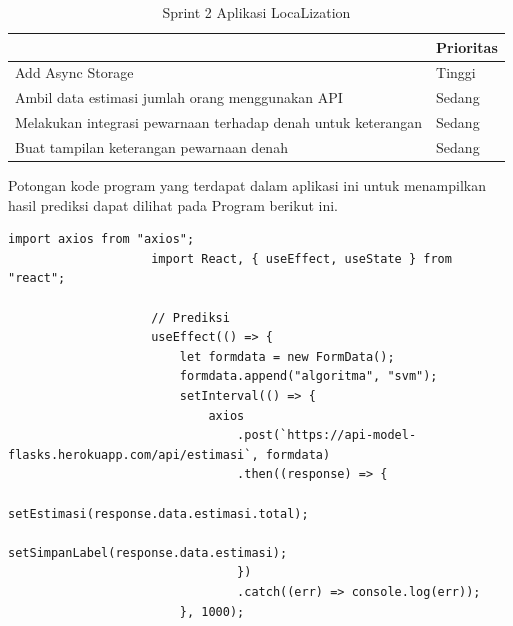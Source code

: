 \begin{enumerate}[1.]
	      \begin{table}[H]
		      \centering
		      \caption{Sprint 2 Aplikasi LocaLization}
		      \label{LocaLization-sprint-2}
		      \begin{tabular}{|l|l|}
			      \hline
			      \rowcolor[HTML]{FFFFFF}
			      \multicolumn{1}{|c|}{\cellcolor[HTML]{FFFFFF}Item}            & \multicolumn{1}{c|}{\cellcolor[HTML]{FFFFFF}Prioritas} \\ \hline
			      Add Async Storage                                             & Tinggi                                                 \\ \hline
			      Ambil data estimasi jumlah orang menggunakan API              & Sedang                                                 \\ \hline
			      Melakukan integrasi pewarnaan terhadap denah untuk keterangan & Sedang                                                 \\ \hline
			      Buat tampilan keterangan pewarnaan denah                      & Sedang                                                 \\ \hline
		      \end{tabular}
	      \end{table}

	      Potongan kode program yang terdapat dalam aplikasi ini untuk menampilkan hasil prediksi dapat dilihat pada Program berikut ini.

	      \vspace{0.4cm}
	      \begin{lstlisting}[label=programKNNDosen]
					import axios from "axios";
					import React, { useEffect, useState } from "react";
					
					// Prediksi
					useEffect(() => {
						let formdata = new FormData();
						formdata.append("algoritma", "svm");
						setInterval(() => {
							axios
								.post(`https://api-model-flasks.herokuapp.com/api/estimasi`, formdata)
								.then((response) => {
									setEstimasi(response.data.estimasi.total);
									setSimpanLabel(response.data.estimasi);
								})
								.catch((err) => console.log(err));
						}, 1000);
				

\end{lstlisting}
\end{enumerate}
